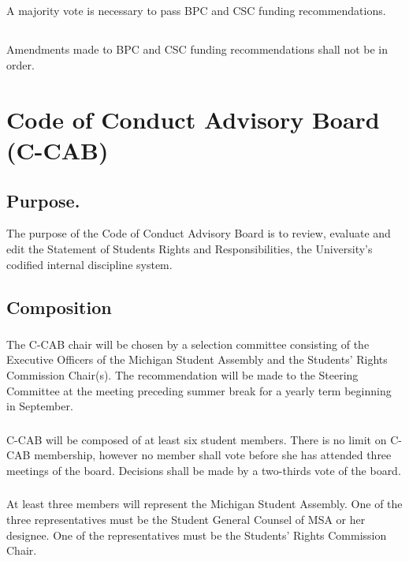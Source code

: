\subsection{}
A majority vote is necessary to pass BPC and CSC funding recommendations.

\subsection{}
Amendments made to BPC and CSC funding recommendations shall not be in order.


\section{Code of Conduct Advisory Board (C-CAB)}

	
\subsection{Purpose.} The purpose of the Code of Conduct Advisory Board is to review, evaluate and edit the Statement of Students Rights and Responsibilities, the University's codified internal discipline system. 

\subsection{Composition} 

\subsubsection{}
The C-CAB chair will be chosen by a selection committee consisting of the Executive Officers of the Michigan Student Assembly and the Students' Rights Commission Chair(s). The recommendation will be made to the Steering Committee at the meeting preceding summer break for a yearly term beginning in September.

\subsubsection{}
C-CAB will be composed of at least six student members. There is no limit on C-CAB membership, however no member shall vote before she has attended three meetings of the board. Decisions shall be made by a two-thirds vote of the board.

\subsubsection{}
At least three members will represent the Michigan Student Assembly. One of the three representatives must be the Student General Counsel of MSA or her designee. One of the representatives must be the Students' Rights Commission Chair.

